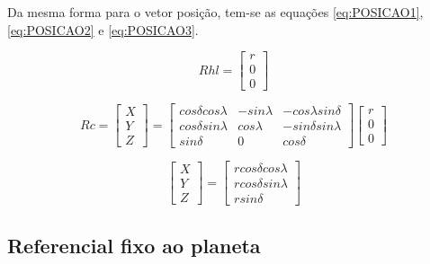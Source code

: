 Da mesma forma para o vetor posição, tem-se as equações \ref{eq:POSICAO1}, \ref{eq:POSICAO2} e \ref{eq:POSICAO3}.

\begin{equation}
Rhl =  
\left[\begin{array}{l}
r \\
0  \\
0 
\end{array}\right]
\label{eq:POSICAO1}
\end{equation}

\begin{equation}
Rc =
\left[\begin{array}{l}
X \\
Y  \\
Z 
\end{array}\right] = 
\left[\begin{array}{lll}
cos \delta cos\lambda & -sin\lambda & -cos\lambda sin\delta \\
cos \delta sin\lambda & cos\lambda & -sin\delta sin\lambda \\
sin \delta & 0 & cos\delta
\end{array}\right]
\left[\begin{array}{l}
r \\
0  \\
0 
\end{array}\right]
\label{eq:POSICAO2}
\end{equation}

\begin{equation}
\left[\begin{array}{l}
X \\
Y  \\
Z 
\end{array}\right] = 
\left[\begin{array}{l}
r cos\delta cos\lambda\\
r cos\delta sin\lambda\\
r sin\delta
\end{array}\right]
\label{eq:POSICAO3}
\end{equation}

\subsection{Referencial fixo ao planeta}

